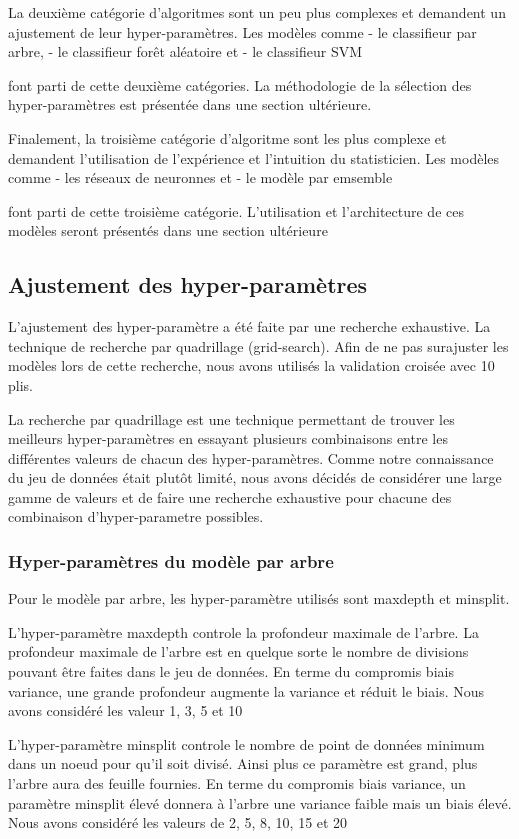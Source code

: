 La deuxième catégorie d'algoritmes sont un peu plus complexes et demandent un ajustement de leur hyper-paramètres. Les modèles comme 
- le classifieur par arbre, 
- le classifieur forêt aléatoire et 
- le classifieur SVM 

font parti de cette deuxième catégories. La méthodologie de la sélection des hyper-paramètres est présentée dans une section ultérieure.

Finalement, la troisième catégorie d'algoritme sont les plus complexe et demandent l'utilisation de l'expérience et l'intuition du statisticien. Les modèles comme 
- les réseaux de neuronnes et 
- le modèle par emsemble 

font parti de cette troisième catégorie. L'utilisation et l'architecture de ces modèles seront présentés dans une section ultérieure

\subsection{Ajustement des hyper-paramètres}

L'ajustement des hyper-paramètre a été faite par une recherche exhaustive. La technique de recherche par quadrillage (grid-search). Afin de ne pas surajuster les modèles lors de cette recherche, nous avons utilisés la validation croisée avec 10 plis.

La recherche par quadrillage est une technique permettant de trouver les meilleurs hyper-paramètres en essayant plusieurs combinaisons entre les différentes valeurs de chacun des hyper-paramètres. Comme notre connaissance du jeu de données était plutôt limité, nous avons décidés de considérer une large gamme de valeurs et de faire une recherche exhaustive pour chacune des combinaison d'hyper-parametre possibles.


\subsubsection{Hyper-paramètres du modèle par arbre}
Pour le modèle par arbre, les hyper-paramètre utilisés sont maxdepth et minsplit. 

L'hyper-paramètre maxdepth controle la profondeur maximale de l'arbre. La profondeur maximale de l'arbre est en quelque sorte le nombre de divisions pouvant être faites dans le jeu de données. En terme du compromis biais variance, une grande profondeur augmente la variance et réduit le biais. Nous avons considéré les valeur 1, 3, 5 et 10

L'hyper-paramètre minsplit controle le nombre de point de données minimum dans un noeud pour qu'il soit divisé. Ainsi plus ce paramètre est grand, plus l'arbre aura des feuille fournies. En terme du compromis biais variance, un paramètre minsplit élevé donnera à l'arbre une variance faible mais un biais élevé. Nous avons considéré les valeurs de 2, 5, 8, 10, 15 et 20


